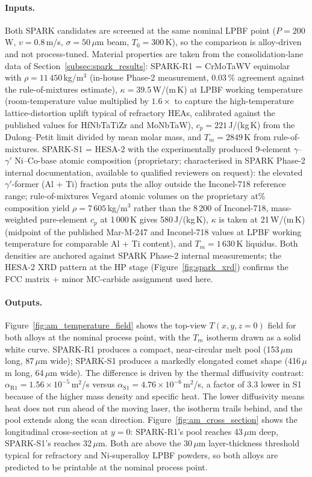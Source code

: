 \documentclass[11pt,a4paper]{article}
\begin{document}
\paragraph{Inputs.}
Both SPARK candidates are screened at the same nominal LPBF point ($P = 200$\,W, $v = 0.8$\,m/s, $\sigma = 50\,\mu$m beam, $T_0 = 300$\,K), so the comparison is alloy-driven and not process-tuned. Material properties are taken from the consolidation-lane data of Section~\ref{subsec:spark_results}: SPARK-R1 = CrMoTaWV equimolar with $\rho = 11\,450$\,kg/m$^3$ (in-house Phase-2 measurement, 0.03\,\% agreement against the rule-of-mixtures estimate), $\kappa = 39.5$\,W/(m\,K) at LPBF working temperature (room-temperature value multiplied by $1.6\times$ to capture the high-temperature lattice-distortion uplift typical of refractory HEAs, calibrated against the published values for HfNbTaTiZr and MoNbTaW), $c_p = 221$\,J/(kg\,K) from the Dulong--Petit limit divided by mean molar mass, and $T_m = 2849$\,K from rule-of-mixtures. SPARK-S1 = HESA-2 with the experimentally produced 9-element $\gamma$--$\gamma'$ Ni--Co-base atomic composition (proprietary; characterised in SPARK Phase-2 internal documentation, available to qualified reviewers on request): the elevated $\gamma'$-former (Al + Ti) fraction puts the alloy outside the Inconel-718 reference range; rule-of-mixtures Vegard atomic volumes on the proprietary at\% composition yield $\rho = 7\,605$\,kg/m$^3$ rather than the 8\,200 of Inconel-718, mass-weighted pure-element $c_p$ at 1\,000\,K gives 580\,J/(kg\,K), $\kappa$ is taken at 21\,W/(m\,K) (midpoint of the published Mar-M-247 and Inconel-718 values at LPBF working temperature for comparable Al + Ti content), and $T_m = 1\,630$\,K liquidus. Both densities are anchored against SPARK Phase-2 internal measurements; the HESA-2 XRD pattern at the HP stage (Figure~\ref{fig:spark_xrd}) confirms the FCC matrix + minor MC-carbide assignment used here.

\paragraph{Outputs.}
Figure~\ref{fig:am_temperature_field} shows the top-view $T(x,y,z=0)$ field for both alloys at the nominal process point, with the $T_m$ isotherm drawn as a solid white curve. SPARK-R1 produces a compact, near-circular melt pool (153\,$\mu$m long, 87\,$\mu$m wide); SPARK-S1 produces a markedly elongated comet shape (416\,$\mu$m long, 64\,$\mu$m wide). The difference is driven by the thermal diffusivity contrast: $\alpha_\text{R1} = 1.56 \times 10^{-5}$\,m$^2$/s versus $\alpha_\text{S1} = 4.76 \times 10^{-6}$\,m$^2$/s, a factor of 3.3 lower in S1 because of the higher mass density and specific heat. The lower diffusivity means heat does not run ahead of the moving laser, the isotherm trails behind, and the pool extends along the scan direction. Figure~\ref{fig:am_cross_section} shows the longitudinal cross-section at $y = 0$: SPARK-R1's pool reaches 43\,$\mu$m deep, SPARK-S1's reaches 32\,$\mu$m. Both are above the 30\,$\mu$m layer-thickness threshold typical for refractory and Ni-superalloy LPBF powders, so both alloys are predicted to be printable at the nominal process point.
\end{document}
